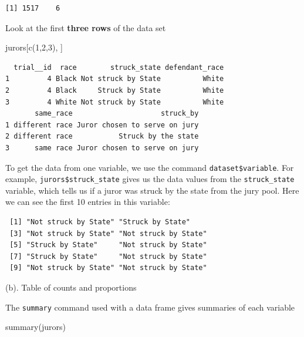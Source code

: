 \documentclass[
]{book}
\newenvironment{Shaded}{\begin{snugshade}}{\end{snugshade}}
\newcommand{\DecValTok}[1]{\textcolor[rgb]{0.00,0.00,0.81}{#1}}
\newcommand{\FunctionTok}[1]{\textcolor[rgb]{0.00,0.00,0.00}{#1}}
\newcommand{\NormalTok}[1]{#1}
\newcommand{\SpecialCharTok}[1]{\textcolor[rgb]{0.00,0.00,0.00}{#1}}
\begin{document}
\begin{verbatim}
[1] 1517    6
\end{verbatim}

Look at the first \textbf{three rows} of the data set

\begin{Shaded}
\begin{Highlighting}[]
\NormalTok{jurors[}\FunctionTok{c}\NormalTok{(}\DecValTok{1}\NormalTok{,}\DecValTok{2}\NormalTok{,}\DecValTok{3}\NormalTok{), ]}
\end{Highlighting}
\end{Shaded}

\begin{verbatim}
  trial__id  race        struck_state defendant_race
1         4 Black Not struck by State          White
2         4 Black     Struck by State          White
3         4 White Not struck by State          White
       same_race                     struck_by
1 different race Juror chosen to serve on jury
2 different race           Struck by the state
3      same race Juror chosen to serve on jury
\end{verbatim}

To get the data from one variable, we use the command \texttt{dataset\$variable}. For example, \texttt{jurors\$struck\_state} gives us the data values from the \texttt{struck\_state} variable, which tells us if a juror was struck by the state from the jury pool. Here we can see the first 10 entries in this variable:

\begin{Shaded}
\end{Shaded}

\begin{verbatim}
 [1] "Not struck by State" "Struck by State"    
 [3] "Not struck by State" "Not struck by State"
 [5] "Struck by State"     "Not struck by State"
 [7] "Struck by State"     "Not struck by State"
 [9] "Not struck by State" "Not struck by State"
\end{verbatim}

(b). Table of counts and proportions

The \texttt{summary} command used with a data frame gives summaries of each variable

\begin{Shaded}
\begin{Highlighting}[]
\FunctionTok{summary}\NormalTok{(jurors)}
\end{Highlighting}
\end{Shaded}
\end{document}

